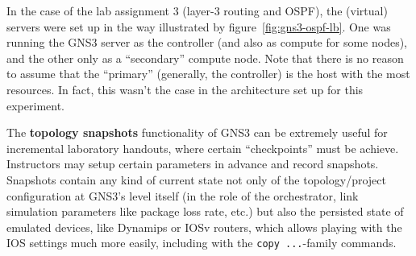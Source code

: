 In the case of the lab assignment 3 (layer-3 routing and OSPF), the (virtual) servers were set up in the way illustrated by figure~\ref{fig:gns3-ospf-lb}.
One was running the GNS3 server as the controller (and also as compute for some nodes), and the other only as a ``secondary'' compute node.
Note that there is no reason to assume that the ``primary'' (generally, the controller) is the host with the most resources.
In fact, this wasn't the case in the architecture set up for this experiment.

The \textbf{topology snapshots} functionality of GNS3 can be extremely useful for incremental laboratory handouts, where certain ``checkpoints'' must be achieve.
Instructors may setup certain parameters in advance and record snapshots.
Snapshots contain any kind of current state not only of the topology/project configuration at GNS3's level itself (in the role of the orchestrator, link simulation parameters like package loss rate, etc.) but also the persisted state of emulated devices, like Dynamips or IOSv routers, which allows playing with the IOS settings much more easily, including with the \texttt{copy ...}-family commands.



